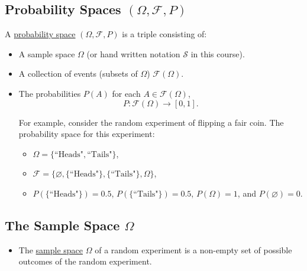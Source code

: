 \documentclass[12pt,thmsa]{article}
\let\emptyset\varnothing
\begin{document}
\subsection{Probability Spaces \((\Omega, \mathcal{F}, P)\) } %

A \underline{probability space} \((\Omega, \mathcal{F}, P)\) is a triple consisting of:
\begin{itemize}
	\item A sample space \(\Omega\) (or hand written notation \(\mathcal{S}\) in this course).
	\item A collection of events (subsets of \(\Omega\)) \(\mathcal{F}(\Omega)\).
	\item The probabilities \(P(A)\) for each \(A \in \mathcal{F}( \Omega )\),
			\[ P:  \mathcal{F}(\Omega) \rightarrow [ 0,1 ].
			\]

	For example, consider the random experiment of flipping a fair coin. The probability space for this experiment:
	\begin{itemize}
		\item \(\Omega = \{\text{``Heads"}, \text{``Tails"}\}\),
		\item \(\mathcal{F} = \{\emptyset, \{\text{``Heads"}\}, \{\text{``Tails"}\}, \Omega\}\),
		\item \(P(\{\text{``Heads"}\}) = 0.5\), \(P(\{\text{``Tails"}\}) = 0.5\), \(P(\Omega) = 1\), and \(P(\emptyset) = 0\).
	\end{itemize}
\end{itemize}

\subsection{The Sample Space \(\Omega\)} %

\begin{itemize}
	\item The \underline{sample space} \(\Omega\) of a random experiment is a non-empty set of possible outcomes of the random experiment.

\end{itemize}
\end{document}

